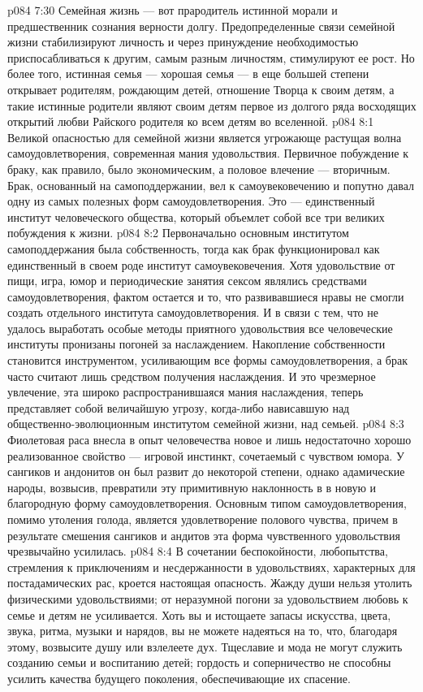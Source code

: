 \vs p084 7:30 Семейная жизнь --- вот прародитель истинной морали и предшественник сознания верности долгу. Предопределенные связи семейной жизни стабилизируют личность и через принуждение необходимостью приспосабливаться к другим, самым разным личностям, стимулируют ее рост. Но более того, истинная семья --- хорошая семья --- в еще большей степени открывает родителям, рождающим детей, отношение Творца к своим детям, а такие истинные родители являют своим детям первое из долгого ряда восходящих открытий любви Райского родителя ко всем детям во вселенной.
\vs p084 8:1 Великой опасностью для семейной жизни является угрожающе растущая волна самоудовлетворения, современная мания удовольствия. Первичное побуждение к браку, как правило, было экономическим, а половое влечение --- вторичным. Брак, основанный на самоподдержании, вел к самоувековечению и попутно давал одну из самых полезных форм самоудовлетворения. Это --- единственный институт человеческого общества, который объемлет собой все три великих побуждения к жизни.
\vs p084 8:2 Первоначально основным институтом самоподдержания была собственность, тогда как брак функционировал как единственный в своем роде институт самоувековечения. Хотя удовольствие от пищи, игра, юмор и периодические занятия сексом являлись средствами самоудовлетворения, фактом остается и то, что развивавшиеся нравы не смогли создать отдельного института самоудовлетворения. И в связи с тем, что не удалось выработать особые методы приятного удовольствия все человеческие институты пронизаны погоней за наслаждением. Накопление собственности становится инструментом, усиливающим все формы самоудовлетворения, а брак часто считают лишь средством получения наслаждения. И это чрезмерное увлечение, эта широко распространившаяся мания наслаждения, теперь представляет собой величайшую угрозу, когда\hyp{}либо нависавшую над общественно\hyp{}эволюционным институтом семейной жизни, над семьей.
\vs p084 8:3 Фиолетовая раса внесла в опыт человечества новое и лишь недостаточно хорошо реализованное свойство --- игровой инстинкт, сочетаемый с чувством юмора. У сангиков и андонитов он был развит до некоторой степени, однако адамические народы, возвысив, превратили эту примитивную наклонность в  в новую и благородную форму самоудовлетворения. Основным типом самоудовлетворения, помимо утоления голода, является удовлетворение полового чувства, причем в результате смешения сангиков и андитов эта форма чувственного удовольствия чрезвычайно усилилась.
\vs p084 8:4 В сочетании беспокойности, любопытства, стремления к приключениям и несдержанности в удовольствиях, характерных для постадамических рас, кроется настоящая опасность. Жажду души нельзя утолить физическими удовольствиями; от неразумной погони за удовольствием любовь к семье и детям не усиливается. Хоть вы и истощаете запасы искусства, цвета, звука, ритма, музыки и нарядов, вы не можете надеяться на то, что, благодаря этому, возвысите душу или взлелеете дух. Тщеславие и мода не могут служить созданию семьи и воспитанию детей; гордость и соперничество не способны усилить качества будущего поколения, обеспечивающие их спасение.
